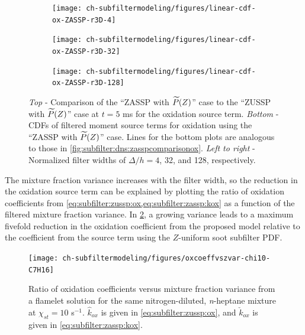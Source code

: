 \begin{figure}[ht]
  \begin{subfigure}[b]{0.33\linewidth}
    \centering
    \texttt{[image: ch-subfiltermodeling/figures/linear-cdf-ox-ZASSP-r3D-4]}
  \end{subfigure}%
  \begin{subfigure}[b]{0.33\linewidth}
    \centering
    \texttt{[image: ch-subfiltermodeling/figures/linear-cdf-ox-ZASSP-r3D-32]}
  \end{subfigure}%
  \begin{subfigure}[b]{0.33\linewidth}
    \centering
    \texttt{[image: ch-subfiltermodeling/figures/linear-cdf-ox-ZASSP-r3D-128]}
  \end{subfigure}
  \caption[\texorpdfstring{$\fst[M]{1,0}^{ox}$}{M1,0ox} Using ZASSP with $\pz$ for Various \texorpdfstring{$\Delta/h$}{D/h}]{\textit{Top} - Comparison of the ``ZASSP with $\pz$'' case to the ``ZUSSP with $\pz$'' case at $t = 5$ ms for the oxidation source term. \textit{Bottom} - CDFs of filtered moment source terms for oxidation using the ``ZASSP with $\pz$'' case. Lines for the bottom plots are analogous to those in \cref{fig:subfilter:dns:zasspcomparisonox}. \textit{Left to right} - Normalized filter widths of $\Delta/h = 4$, 32, and 128, respectively.}
  \label{fig:subfilter:dns:moxfwidth}
\end{figure}

The mixture fraction variance increases with the filter width, so the reduction in the oxidation source term can be explained by plotting the ratio of oxidation coefficients from \cref{eq:subfilter:zussp:ox,eq:subfilter:zassp:kox} as a function of the filtered mixture fraction variance. In \cref{fig:subfilter:dns:coeffvszvar}, a growing variance leads to a maximum fivefold reduction in the oxidation coefficient from the proposed model relative to the coefficient from the source term using the $Z$-uniform soot subfilter PDF. %


\begin{figure}[htb]
  \centering
  \texttt{[image: ch-subfiltermodeling/figures/oxcoeffvszvar-chi10-C7H16]}
  \caption[Ratio of Oxidation Coefficients vs. \texorpdfstring{$\tf{Z_{\text{V}}}$}{Zv}]{Ratio of oxidation coefficients versus mixture fraction variance from a flamelet solution for the same nitrogen-diluted, \textit{n}-heptane mixture at $\chi_{st} = 10$ s$^{-1}$. $\hat{k}_{ox}$ is given in \cref{eq:subfilter:zussp:ox}, and $\check{k}_{ox}$ is given in \cref{eq:subfilter:zassp:kox}.}
  \label{fig:subfilter:dns:coeffvszvar}
\end{figure}

